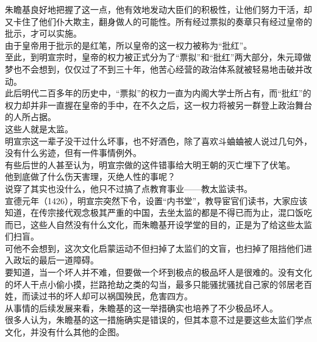 \begin{multicols}{\theparacolNo}
朱瞻基良好地把握了这一点，他有效地发动大臣们的积极性，让他们努力干活，却又卡住了他们仆大欺主，翻身做人的可能性。所有经过票拟的奏章只有经过皇帝的批示，才可以实施。\\

由于皇帝用于批示的是红笔，所以皇帝的这一权力被称为“批红”。\\

至此，到明宣宗时，皇帝的权力被正式分为了“票拟”和“批红”两大部分，朱元璋做梦也不会想到，仅仅过了不到三十年，他苦心经营的政治体系就被轻易地击破并改动。\\

此后明代二百多年的历史中，“票拟”的权力一直为内阁大学士所占有，而“批红”的权力却并非一直握在皇帝的手中，在不久之后，这一权力将被另一群登上政治舞台的人所占据。\\

这些人就是太监。\\

明宣宗这一辈子没干过什么坏事，也不好酒色，除了喜欢斗蛐蛐被人说过几句外，没有什么劣迹，但有一件事情例外。\\

有些后世的人甚至认为，明宣宗做的这件错事给大明王朝的灭亡埋下了伏笔。\\

他到底做了什么伤天害理，灭绝人性的事呢？\\

说穿了其实也没什么，他只不过搞了点教育事业——教太监读书。\\

宣德元年（1426），明宣宗突然下令，设置“内书堂”，教导宦官们读书，大家应该知道，在传宗接代观念极其严重的中国，去坐太监的都是不得已而为止，混口饭吃而已，这些人自然没有什么文化，而朱瞻基开设学堂的目的，正是为了给这些太监们扫盲。\\

可他不会想到，这次文化启蒙运动不但扫掉了太监们的文盲，也扫掉了阻挡他们进入政坛的最后一道障碍。\\

要知道，当一个坏人并不难，但要做一个坏到极点的极品坏人是很难的。没有文化的坏人干点小偷小摸，拦路抢劫之类的勾当，最多只能骚扰骚扰自己家的邻居老百姓，而读过书的坏人却可以祸国殃民，危害四方。\\

从事情的后续发展来看，朱瞻基的这一举措确实也培养了不少极品坏人。\\

很多人认为，朱瞻基的这一措施确实是错误的，但其本意不过是要这些太监们学点文化，并没有什么其他的企图。\\


\end{multicols}
